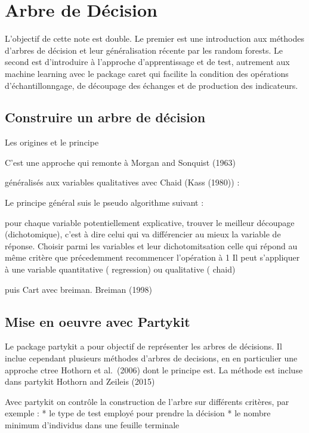 \documentclass[
]{book}
\begin{document}
\hypertarget{arbre-de-duxe9cision}{%
\chapter{Arbre de Décision}\label{arbre-de-duxe9cision}}

L'objectif de cette note est double. Le premier est une introduction aux méthodes d'arbres de décision et leur généralisation récente par les random forests. Le second est d'introduire à l'approche d'apprentissage et de test, autrement aux machine learning avec le package caret qui facilite la condition des opérations d'échantillonngage, de découpage des échanges et de production des indicateurs.

\hypertarget{construire-un-arbre-de-duxe9cision}{%
\section{Construire un arbre de décision}\label{construire-un-arbre-de-duxe9cision}}

Les origines et le principe

C'est une approche qui remonte à Morgan and Sonquist (1963)

généralisés aux variables qualitatives avec Chaid (Kass (1980)) :

Le principe général suis le pseudo algorithme suivant :

pour chaque variable potentiellement explicative, trouver le meilleur découpage (dichotomique), c'est à dire celui qui va différencier au mieux la variable de réponse.
Choisir parmi les variables et leur dichotomitsation celle qui répond au même critère que précedemment
recommencer l'opération à 1
Il peut s'appliquer à une variable quantitative ( regression) ou qualitative ( chaid)

puis Cart avec breiman. Breiman (1998)

\hypertarget{mise-en-oeuvre-avec-partykit}{%
\section{Mise en oeuvre avec Partykit}\label{mise-en-oeuvre-avec-partykit}}

Le package partykit a pour objectif de représenter les arbres de décisions. Il inclue cependant plusieurs méthodes d'arbres de decisions, en en particulier une approche ctree Hothorn et al.~(2006) dont le principe est. La méthode est incluse dans partykit Hothorn and Zeileis (2015)

Avec partykit on contrôle la construction de l'arbre sur différents critères, par exemple : * le type de test employé pour prendre la décision * le nombre minimum d'individus dans une feuille terminale
\end{document}

